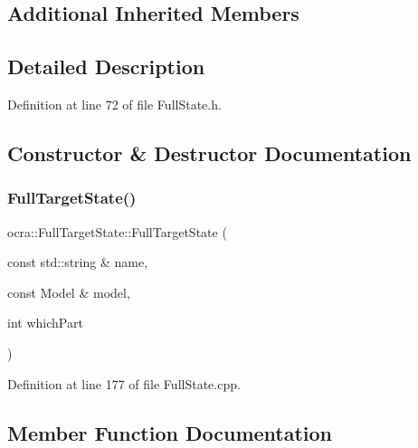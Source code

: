 \subsection*{Additional Inherited Members}


\subsection{Detailed Description}


Definition at line 72 of file Full\+State.\+h.



\subsection{Constructor \& Destructor Documentation}
\hypertarget{classocra_1_1FullTargetState_a8164de6021f986fb82022b2fed1e0402}{}\label{classocra_1_1FullTargetState_a8164de6021f986fb82022b2fed1e0402} 
\subsubsection{\texorpdfstring{Full\+Target\+State()}{FullTargetState()}}
{\footnotesize\ttfamily ocra\+::\+Full\+Target\+State\+::\+Full\+Target\+State (\begin{DoxyParamCaption}\item[{const std\+::string \&}]{name,  }\item[{const Model \&}]{model,  }\item[{int}]{which\+Part }\end{DoxyParamCaption})}



Definition at line 177 of file Full\+State.\+cpp.



\subsection{Member Function Documentation}
\hypertarget{classocra_1_1FullTargetState_ad7a1b06462ba3cc348e5634e1a0db0b2}{}\label{classocra_1_1FullTargetState_ad7a1b06462ba3cc348e5634e1a0db0b2} 
